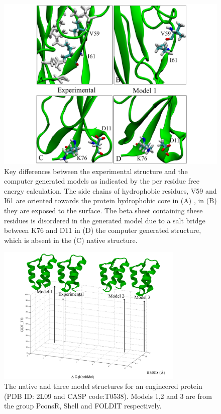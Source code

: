 \documentclass[12pt]{article}
\begin{document}
\begin{figure}
\begin{center}
\includegraphics[width=5 in,height=4 in]{T0569_perres2.pdf}
\end{center}
\caption{Key differences between the experimental structure and the computer generated models as
    indicated by the per residue free energy calculation.
The side chains of hydrophobic residues, V59 and I61 are oriented towards the protein hydrophobic core in (A)  
, in (B) they are exposed to the surface. The beta sheet containing these residues is disordered in
the generated model due to
a salt bridge between K76 and D11 in (D) the computer generated structure, which is absent in the (C) native structure.}
\label{fig:T0569_per_residue}
\end{figure}

\begin{figure}
\begin{center}
\includegraphics[width=3.5in]{T0538.pdf}
\end{center}
\caption{The native and three model structures for an engineered protein (PDB ID: 2L09 and CASP
    code:T0538). Models 1,2 and 3 are from the group PconsR, Shell and FOLDIT respectively.}
\label{fig:T0538}
\end{figure}
\end{document}

